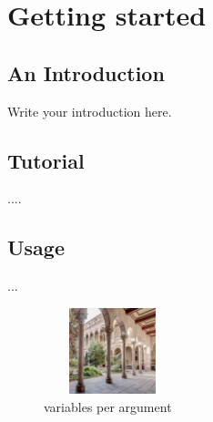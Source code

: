 \documentclass[a4paper, 12pt, oneside, times, print, NoDraft]{template/UBtemplate}
\begin{document}




\frontmatter %







\mainmatter %










\chapter{Getting started}

\section{An Introduction}

Write your introduction here.

\section{Tutorial}

....

\section{Usage}




...

\begin{figure}[H]
    \centering
    \includegraphics[width=4cm, height=2.5cm]{images/edifici-historic-universitat-de-barcelona.jpg}
    \caption{variables per argument}
    \label{taula}
\end{figure}%
\end{document}

